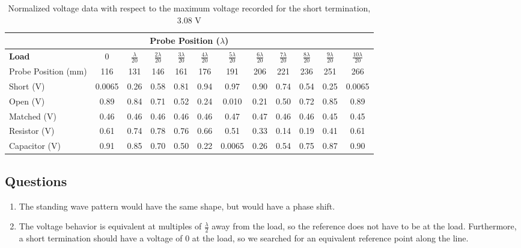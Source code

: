 \documentclass{article}
\begin{document}
\begin{enumerate}
	\begin{table}[h]
	\centering
		\begin{tabular}{|l|c|c|c|c|c|c|c|c|c|c|c|}
		\hline
		\multicolumn{12}{|c|}{\textbf{Probe Position ($\lambda$)}}                                                         		\\ \hline
		\textbf{Load}       & 0      & $\frac{\lambda}{20}$    & $\frac{2\lambda}{20}$    & $\frac{3\lambda}{20}$    & $\frac{4\lambda}{20}$    & $\frac{5\lambda}{20}$      & $\frac{6\lambda}{20}$    & $\frac{7\lambda}{20}$    & $\frac{8\lambda}{20}$    & $\frac{9\lambda}{20}$    & $\frac{10\lambda}{20}$     		\\ \hline
		Probe Position (mm) & 116    & 131  & 146  & 161  & 176  & 191    & 206  & 221  & 236  & 251  & 266    		\\ \hline
		Short (V)           & 0.0065 & 0.26 & 0.58 & 0.81 & 0.94 & 0.97   & 0.90 & 0.74 & 0.54 & 0.25 & 0.0065 		\\ \hline
		Open (V)            & 0.89   & 0.84 & 0.71 & 0.52 & 0.24 & 0.010  & 0.21 & 0.50 & 0.72 & 0.85 & 0.89   		\\ \hline
		Matched (V)         & 0.46   & 0.46 & 0.46 & 0.46 & 0.46 & 0.47   & 0.47 & 0.46 & 0.46 & 0.45 & 0.45   		\\ \hline
		Resistor (V)        & 0.61   & 0.74 & 0.78 & 0.76 & 0.66 & 0.51   & 0.33 & 0.14 & 0.19 & 0.41 & 0.61   		\\ \hline
		Capacitor (V)       & 0.91   & 0.85 & 0.70 & 0.50 & 0.22 & 0.0065 & 0.26 & 0.54 & 0.75 & 0.87 & 0.90   		\\ \hline
		\end{tabular}
		\caption{Normalized voltage data with respect to the maximum voltage recorded for the short termination, 3.08 V}
		\label{}
	\end{table}
\end{enumerate}

\subsection{Questions}
\begin{enumerate}
	\item The standing wave pattern would have the same shape, but would have a phase shift.
	\item The voltage behavior is equivalent at multiples of $\frac{\lambda}{2}$ away from the load, so the reference does not have to be at the load. Furthermore, a short termination should have a voltage of 0 at the load, so we searched for an equivalent reference point along the line.
\end{enumerate}
\end{document}
